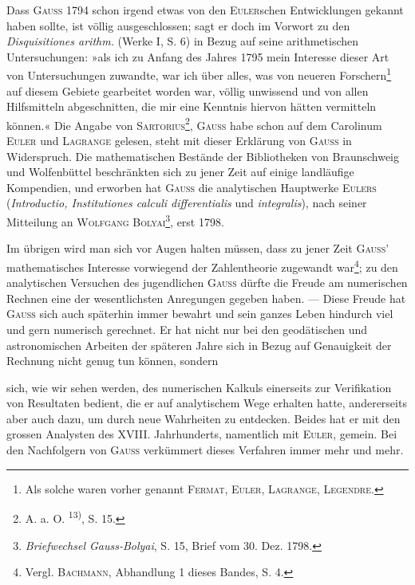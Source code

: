 Dass \textsc{Gauss} 1794 schon irgend etwas von den \textsc{Euler}schen Entwicklungen
gekannt haben sollte, ist völlig ausgeschlossen; sagt er doch im Vorwort zu
den \textit{Disquisitiones arithm.} (Werke I, S. 6) in Bezug auf seine arithmetischen
Untersuchungen: »als ich zu Anfang des Jahres 1795 mein Interesse dieser
Art von Untersuchungen zuwandte, war ich über alles, was von neueren
Forschern\footnote{Als solche waren vorher genannt \textsc{Fermat}, \textsc{Euler}, \textsc{Lagrange}, \textsc{Legendre}.} auf diesem Gebiete gearbeitet worden war, völlig unwissend und
von allen Hilfsmitteln abgeschnitten, die mir eine Kenntnis hiervon hätten
vermitteln können.« Die Angabe von \textsc{Sartorius}\footnote{A. a. O. \textsuperscript{13)}, S. 15.}, \textsc{Gauss} habe schon auf dem
Carolinum \textsc{Euler} und \textsc{Lagrange} gelesen, steht mit dieser Erklärung von \textsc{Gauss}
in Widerspruch. Die mathematischen Bestände der Bibliotheken von Braunschweig
und Wolfenbüttel beschränkten sich zu jener Zeit auf einige landläufige
Kompendien, und erworben hat \textsc{Gauss} die analytischen Hauptwerke \textsc{Eulers}
(\textit{Introductio, Institutiones calculi differentialis} und \textit{integralis}), nach seiner Mitteilung
an \textsc{Wolfgang Bolyai}\footnote{\textit{Briefwechsel Gauss-Bolyai}, S. 15, Brief vom 30. Dez. 1798.}, erst 1798.

Im übrigen wird man sich vor Augen halten müssen, dass zu jener Zeit
\textsc{Gauss}’ mathematisches Interesse vorwiegend der Zahlentheorie zugewandt war\footnote{Vergl. \textsc{Bachmann}, Abhandlung 1 dieses Bandes, S. 4.};
zu den analytischen Versuchen des jugendlichen \textsc{Gauss} dürfte die Freude am
numerischen Rechnen eine der wesentlichsten Anregungen gegeben haben. —
Diese Freude hat \textsc{Gauss} sich auch späterhin immer bewahrt und sein ganzes
Leben hindurch viel und gern numerisch gerechnet. Er hat nicht nur
bei den geodätischen und astronomischen Arbeiten der späteren Jahre sich
in Bezug auf Genauigkeit der Rechnung nicht genug tun können, sondern\par
{}
\clearpage{}
\noindent sich, wie wir sehen werden, des numerischen Kalkuls einerseits zur Verifikation
von Resultaten bedient, die er auf analytischem Wege erhalten hatte,
andererseits aber auch dazu, um durch  neue Wahrheiten
zu entdecken. Beides hat er mit den grossen Analysten des XVIII.
Jahrhunderts, namentlich mit \textsc{Euler}, gemein. Bei den Nachfolgern von \textsc{Gauss}
verkümmert dieses Verfahren immer mehr und mehr.

